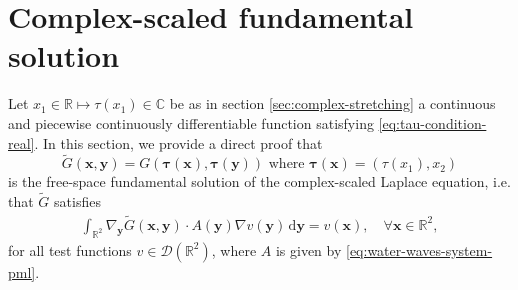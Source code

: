 \documentclass[review,hidelinks,onefignum,onetabnum]{siamart220329}
\newcommand{\R}{\mathbb{R}}
\newcommand{\C}{\mathbb{C}}
\newcommand{\bx}{\mathbf{x}}
\newcommand{\btau}{\boldsymbol{\tau}}
\newcommand{\by}{\mathbf{y}}
\newcommand{\de}{\,\mathrm{d}}
\begin{document}
\section{Complex-scaled fundamental solution}\label{sec:fundamental-solution}
Let $x_1\in\R\mapsto \tau(x_1)\in\C$ be as in section \ref{sec:complex-stretching} a   continuous and piecewise continuously differentiable function satisfying \eqref{eq:tau-condition-real}. 
 In this section, we provide a direct proof that $$\widetilde{G}(\bx,\by)=G(\btau(\bx),\btau(\by))\mbox{ where }\btau(\bx)=(\tau(x_1),x_2)$$  is the free-space fundamental solution of the complex-scaled Laplace equation,  i.e. that $\widetilde{G}$
 satisfies 
 \begin{align}
 \label{eq:identityGreen}
  \int_{\R^2} \nabla_\by\widetilde{G}(\bx,\by) \cdot   A(\by) \nabla v(\by)   \de \by = v(\bx),\quad \forall \bx\in \R^2,
 \end{align}
 for all test functions $v \in \mathcal{D}(\R^2)$, where $A$ is given by \eqref{eq:water-waves-system-pml}.
 
\end{document}
